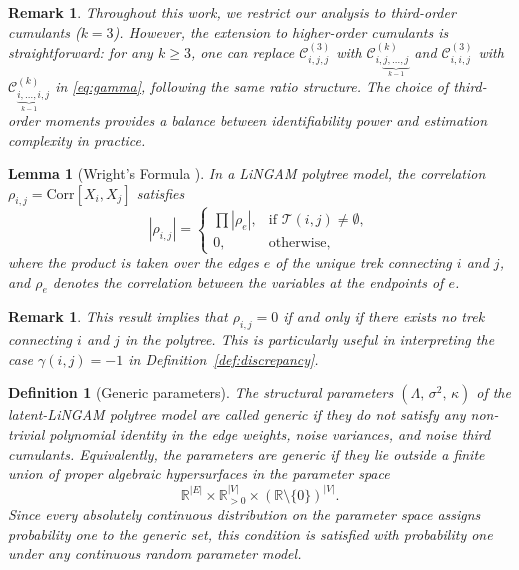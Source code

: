 \documentclass[11pt,a4paper]{article}
\numberwithin{equation}{section}
\newtheorem{definition}[theorem]{Definition}
\newtheorem{lemma}[theorem]{Lemma}
\newtheorem{remark}[theorem]{Remark}
\begin{document}
\begin{remark}
Throughout this work, we restrict our analysis to third-order cumulants ($k=3$). However, the extension to higher-order cumulants is straightforward: for any $k \geq 3$, one can replace $\mathcal{C}^{(3)}_{i,j,j}$ with $\mathcal{C}^{(k)}_{i,\underbrace{j,\ldots,j}_{k-1}}$ and $\mathcal{C}^{(3)}_{i,i,j}$ with $\mathcal{C}^{(k)}_{\underbrace{i,\ldots,i}_{k-1},j}$ in \eqref{eq:gamma}, following the same ratio structure. The choice of third-order moments provides a balance between identifiability power and estimation complexity in practice.
\end{remark}

\begin{lemma}[Wright's Formula {\citealp{wright:1960}}]
\label{lem:wright}
In a LiNGAM polytree model, the correlation $\rho_{i,j} = \text{Corr}[X_i,X_j]$ satisfies
\begin{equation}
  |\rho_{i,j}| =
  \begin{cases}
    \prod |\rho_e|, & \text{if } \mathcal{T}(i,j) \ne \emptyset, \\[0.5ex]
    0, & \text{otherwise},
  \end{cases}
\end{equation}
where the product is taken over the edges $e$ of the unique trek connecting $i$ and $j$, and $\rho_e$ denotes the correlation between the variables at the endpoints of $e$.
\end{lemma}

\begin{remark}
This result implies that $\rho_{i,j} = 0$ if and only if there exists no trek connecting $i$ and $j$ in the polytree. This is particularly useful in interpreting the case $\gamma(i,j) = -1$ in Definition~\ref{def:discrepancy}.
\end{remark}

\begin{definition}[Generic parameters]\label{def:generic}
The structural parameters $(\Lambda,\,\sigma^2,\,\kappa)$ of the
latent-LiNGAM polytree model are called \emph{generic} if they do not
satisfy any non-trivial polynomial identity in the edge weights, noise
variances, and noise third cumulants.  Equivalently, the parameters are
generic if they lie outside a finite union of proper algebraic
hypersurfaces in the parameter space
\[
  \mathbb{R}^{|E|}
  \times\mathbb{R}_{>0}^{|V|}
  \times(\mathbb{R}\setminus\{0\})^{|V|}.
\]
Since every absolutely continuous distribution on the parameter space
assigns probability one to the generic set, this condition is satisfied
with probability one under any continuous random parameter model.
\end{definition}
\end{document}
